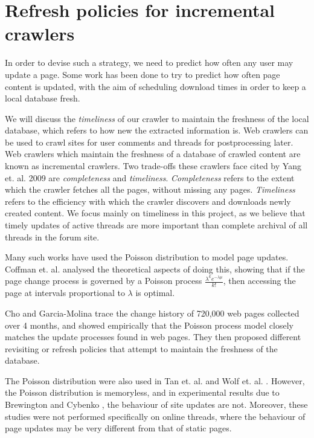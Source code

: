 \section{Refresh policies for incremental crawlers}
In order to devise such a strategy, we need to predict how often any user may 
update a page. Some work has been done to try to predict how often page content 
is updated, with the aim of scheduling download times in order to keep a local 
database fresh.


We will discuss the \emph{timeliness} of our crawler to maintain the freshness 
of the local database, which refers to how new the extracted information is. Web 
crawlers can be used to crawl sites for user comments and threads for 
postprocessing later. Web crawlers which maintain the freshness of a database of 
crawled content are known as incremental crawlers. Two trade-offs these crawlers 
face cited by Yang et. al. 2009 \cite{Yang2009} are \emph{completeness} and 
\emph{timeliness}. \emph{Completeness} refers to the extent which the crawler 
fetches all the pages, without missing any pages. \emph{Timeliness} refers to 
the efficiency with which the crawler discovers and downloads newly created 
content. We focus mainly on timeliness in this project, as we believe that 
timely updates of active threads are more important than complete archival of 
all threads in the forum site.

Many such works have used the Poisson distribution to model page updates.  
Coffman et. al. \cite{Coffman1997} analysed the theoretical aspects of doing 
this, showing that if the page change process is governed by a Poisson process 
$\frac{\lambda^k e^{-\lambda \mu}}{k!}$, then accessing the page at intervals 
proportional to $\lambda$ is optimal.

Cho and Garcia-Molina trace the change history of 720,000 web pages collected 
over 4 months, and showed empirically that the Poisson process model closely 
matches the update processes found in web pages\cite{Cho1999}. They then 
proposed different revisiting or refresh policies 
\cite{Cho2003,Garcia-molina2003} that attempt to maintain the freshness of the 
database.

The Poisson distribution were also used in Tan et. al. \cite{Tan2007} and Wolf 
et. al. \cite{Wolf2002}. %
However, the Poisson distribution is memoryless, and in experimental results due 
to Brewington and Cybenko \cite{Brian2000}, the behaviour of site updates are 
not. Moreover, these studies were not performed specifically on online threads, 
where the behaviour of page updates may be very different from that of static 
pages.

